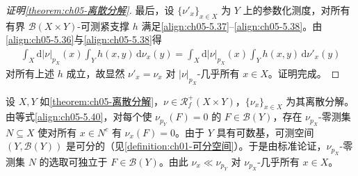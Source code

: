 \documentclass[../../main.tex]{subfiles}%
\begin{document}
\begin{proof}[证明\cref{theorem:ch05-离散分解}]
最后，设 $\{\nu'_x\}_{x\in X}$ 为 $Y$ 上的参数化测度，对所有有界 $\mathscr{B}(X\times Y)$-可测紧支撑 $h$ 满足\eqref{align:ch05-5.37}–\eqref{align:ch05-5.38}。由\eqref{align:ch05-5.36}与\eqref{align:ch05-5.38}得
\begin{align*}
\int_X\mathrm{d}|\nu|_{p_X}(x)\int_Y h(x,y)\,\mathrm{d}\nu_x(y)
=\int_X\mathrm{d}|\nu|_{p_X}(x)\int_Y h(x,y)\,\mathrm{d}\nu'_x(y)
\end{align*}
对所有上述 $h$ 成立，故显然 $\nu'_x=\nu_x$ 对 $|\nu|_{p_X}$-几乎所有 $x\in X$。证明完成。
\end{proof}

\begin{remark}\label{remark:ch05-离散分解绝对连续}
设 $X,Y$ 如\cref{theorem:ch05-离散分解}，$\nu\in\mathscr{R}^+_f(X\times Y)$，$\{\nu_x\}_{x\in X}$ 为其离散分解。由等式\eqref{align:ch05-5.40}，对每个使 $\nu_{p_Y}(F)=0$ 的 $F\in\mathscr{B}(Y)$，存在 $\nu_{p_X}$-零测集 $N\subseteq X$ 使对所有 $x\in N^c$ 有 $\nu_x(F)=0$。由于 $Y$ 具有可数基，可测空间 $(Y,\mathscr{B}(Y))$ 是可分的（见\cref{definition:ch01-可分空间}）。于是由标准论证，$\nu_{p_X}$-零测集 $N$ 的选取可独立于 $F\in\mathscr{B}(Y)$。由此 $\nu_x\ll\nu_{p_Y}$ 对 $\nu_{p_X}$-几乎所有 $x\in X$。
\end{remark}
\end{document}
